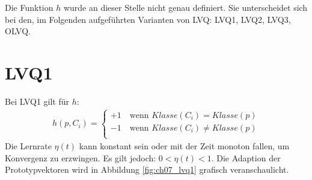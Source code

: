 Die Funktion $h$ wurde an dieser Stelle nicht genau definiert. Sie unterscheidet sich bei den, im Folgenden aufgeführten Varianten von LVQ: LVQ1, LVQ2, LVQ3, OLVQ.


\section*{LVQ1}
Bei LVQ1 gilt für $h$:
\begin{align*}
	h(p, C_i) =
	\begin{cases}
		+1 \quad \text{wenn } Klasse(C_i) = Klasse(p) \\
		-1 \quad \text{wenn } Klasse(C_i) \ne Klasse(p) \\
	\end{cases}
\end{align*}
\noindent
Die Lernrate $\eta(t)$ kann konstant sein oder mit der Zeit monoton fallen, um Konvergenz zu erzwingen. Es gilt jedoch: $0 < \eta(t) < 1$.
Die Adaption der Prototypvektoren wird in Abbildung \ref{fig:ch07_lvq1} grafisch veranschaulicht.


